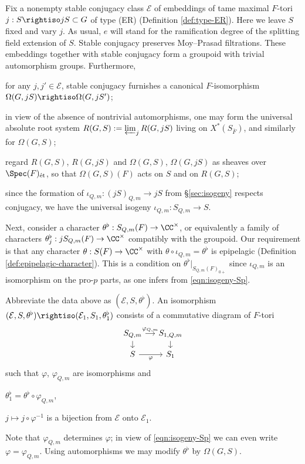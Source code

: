 \documentclass[a4paper,10pt]{article}
\begin{document}
Fix a nonempty stable conjugacy class $\mathcal{E}$ of embeddings of tame maximal $F$-tori $j: S \rightiso jS \subset G$ of type (ER) (Definition \ref{def:type-ER}). Here we leave $S$ fixed and vary $j$. As usual, $e$ will stand for the ramification degree of the splitting field extension of $S$. Stable conjugacy preserves Moy--Prasad filtrations. These embeddings together with stable conjugacy form a groupoid with trivial automorphism groups. Furthermore,
\begin{compactitem}
	\item for any $j, j' \in \mathcal{E}$, stable conjugacy furnishes a canonical $F$-isomorphism $\Omega(G, jS) \rightiso \Omega(G, jS')$;
	\item in view of the absence of nontrivial automorphisms, one may form the universal absolute root system $R(G, S) := \varprojlim_j R(G, jS)$ living on $X^*(S_{\bar{F}})$, and similarly for $\Omega(G, S)$;
	\item regard $R(G,S)$, $R(G, jS)$ and $\Omega(G,S)$, $\Omega(G,jS)$ as sheaves over $\Spec(F)_{\text{ét}}$, so that $\Omega(G,S)(F)$ acts on $S$ and on $R(G,S)$;
	\item since the formation of $\iota_{Q,m}: (jS)_{Q,m} \to jS$ from \S\ref{sec:isogeny} respects conjugacy, we have the universal isogeny $ \iota_{Q,m}: S_{Q,m} \to S$.
\end{compactitem} \index{$\theta^\flat$}
Next, consider a character $\theta^\flat: S_{Q,m}(F) \to \CC^\times$, or equivalently a family of characters $\theta^\flat_j: jS_{Q,m}(F) \to \CC^\times$ compatibly with the groupoid. Our requirement is that any character $\theta: S(F) \to \CC^\times$ with $\theta \circ \iota_{Q,m} = \theta^\flat$ is epipelagic (Definition \ref{def:epipelagic-character}). This is a condition on $\theta^\flat|_{S_{Q,m}(F)_{0+}}$ since $\iota_{Q,m}$ is an isomorphism on the pro-$p$ parts, as one infers from \eqref{eqn:isogeny-Sp}.

\begin{definition}\label{def:inducing-data} 
	Abbreviate the data above as $(\mathcal{E}, S, \theta^\flat)$. An isomorphism $(\mathcal{E}, S, \theta^\flat) \rightiso (\mathcal{E}_1, S_1, \theta^\flat_1)$ consists of a commutative diagram of $F$-tori
	\[\begin{tikzcd}[row sep=small, column sep=small]
		S_{Q,m} \arrow{r}{\varphi_{Q,m}} \arrow{d} & S_{1, Q,m} \arrow{d} \\
		S \arrow{r}[swap]{\varphi} & S_1
	\end{tikzcd}\]
	such that $\varphi$, $\varphi_{Q,m}$ are isomorphisms and
	\begin{compactitem}
		\item $\theta^\flat_1 = \theta^\flat \circ \varphi_{Q,m}$,
		\item $j \mapsto j \circ \varphi^{-1}$ is a bijection from $\mathcal{E}$ onto $\mathcal{E}_1$.
	\end{compactitem}
\end{definition}
Note that $\varphi_{Q,m}$ determines $\varphi$; in view of \eqref{eqn:isogeny-Sp} we can even write $\varphi = \varphi_{Q,m}$. Using automorphisms we may modify $\theta^\flat$ by $\Omega(G,S)$.
\end{document}
